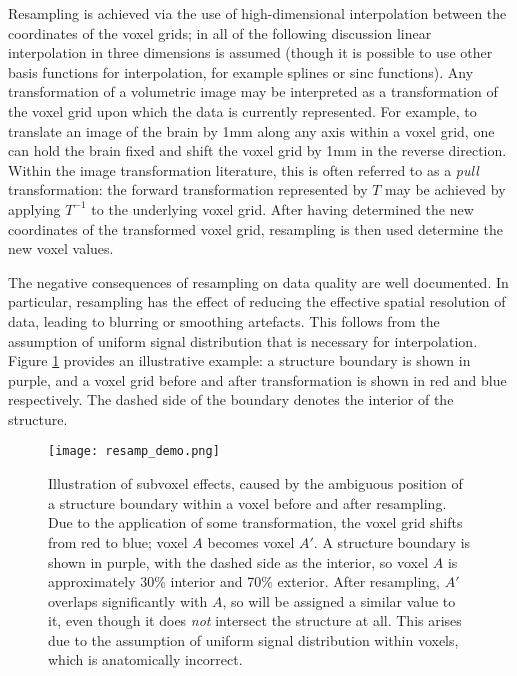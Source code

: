 Resampling is achieved via the use of high-dimensional interpolation between the coordinates of the voxel grids; in all of the following discussion linear interpolation in three dimensions is assumed (though it is possible to use other basis functions for interpolation, for example splines or sinc functions). Any transformation of a volumetric image may be interpreted as a transformation of the voxel grid upon which the data is currently represented. For example, to translate an image of the brain by 1mm along any axis within a voxel grid, one can hold the brain fixed and shift the voxel grid by 1mm in the reverse direction. Within the image transformation literature, this is often referred to as a \textit{pull} transformation: the forward transformation represented by $T$ may be achieved by applying $T^{-1}$ to the underlying voxel grid. After having determined the new coordinates of the transformed voxel grid, resampling is then used determine the new voxel values. 

The negative consequences of resampling on data quality are well documented. In particular, resampling has the effect of reducing the effective spatial resolution of data, leading to blurring or smoothing artefacts. This follows from the assumption of uniform signal distribution that is necessary for interpolation. Figure \ref{resamp_demo} provides an illustrative example: a structure boundary is shown in purple, and a voxel grid before and after transformation is shown in red and blue respectively. The dashed side of the boundary denotes the interior of the structure. 

\begin{figure}
\centering
\texttt{[image: resamp\_demo.png]}
\caption{Illustration of subvoxel effects, caused by the ambiguous position of a structure boundary within a voxel before and after resampling. Due to the application of some transformation, the voxel grid shifts from red to blue; voxel $A$ becomes voxel $A'$. A structure boundary is shown in purple, with the dashed side as the interior, so voxel $A$ is approximately 30\% interior and 70\% exterior. After resampling, $A'$ overlaps significantly with $A$, so will be assigned a similar value to it, even though it does \textit{not} intersect the structure at all. This arises due to the assumption of uniform signal distribution within voxels, which is anatomically incorrect.}
\label{resamp_demo}
\end{figure}

